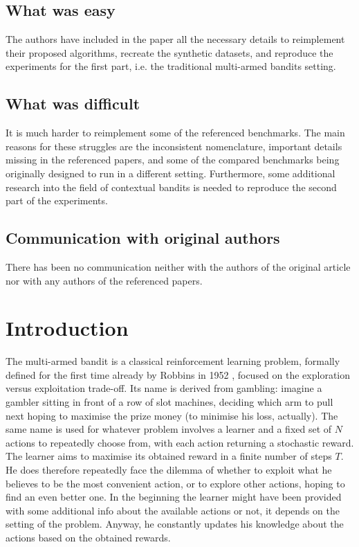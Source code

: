 \subsection*{What was easy}

The authors have included in the paper all the necessary details to reimplement their proposed algorithms, recreate the synthetic datasets, and reproduce the experiments for the first part, i.e. the traditional multi-armed bandits setting.

\subsection*{What was difficult}

It is much harder to reimplement some of the referenced benchmarks. The main reasons for these struggles are the inconsistent nomenclature, important details missing in the referenced papers, and some of the compared benchmarks being originally designed to run in a different setting. Furthermore, some additional research into the field of contextual bandits is needed to reproduce the second part of the experiments.

\subsection*{Communication with original authors}

There has been no communication neither with the authors of the original article nor with any authors of the referenced papers.

\section{Introduction}

The multi-armed bandit is a classical reinforcement learning problem, formally defined for the first time already by Robbins in 1952 \cite{robbins}, focused on the exploration versus exploitation trade-off. Its name is derived from gambling: imagine a gambler sitting in front of a row of slot machines, deciding which arm to pull next hoping to maximise the prize money (to minimise his loss, actually). The same name is used for whatever problem involves a learner and a fixed set of $N$ actions to repeatedly choose from, with each action returning a stochastic reward. The learner aims to maximise its obtained reward in a finite number of steps $T$. He does therefore repeatedly face the dilemma of whether to exploit what he believes to be the most convenient action, or to explore other actions, hoping to find an even better one. In the beginning the learner might have been provided with some additional info about the available actions or not, it depends on the setting of the problem. Anyway, he constantly updates his knowledge about the actions based on the obtained rewards. 

